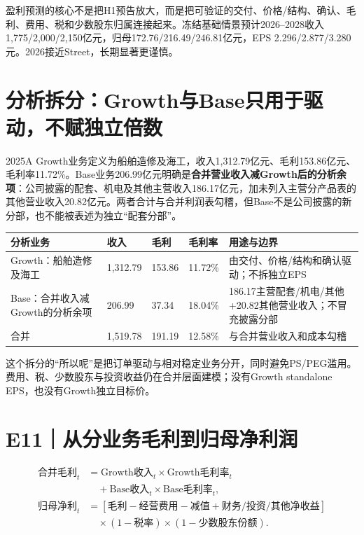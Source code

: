 盈利预测的核心不是把H1预告放大，而是把可验证的交付、价格/结构、确认、毛利、费用、税和少数股东归属连接起来。冻结基础情景预计2026--2028收入1,775/2,000/2,150亿元，归母172.76/216.49/246.81亿元，EPS 2.296/2.877/3.280元。2026接近Street，长期显著更谨慎。

\section{分析拆分：Growth与Base只用于驱动，不赋独立倍数}

2025A Growth业务定义为船舶造修及海工，收入1,312.79亿元、毛利153.86亿元、毛利率11.72\%。Base业务206.99亿元明确是\textbf{合并营业收入减Growth后的分析余项}：公司披露的配套、机电及其他主营收入186.17亿元，加未列入主营分产品表的其他营业收入20.82亿元。两者合计与合并利润表勾稽，但Base不是公司披露的新分部，也不能被表述为独立“配套分部”。

\begin{exhibitbox}[2025A分析基线]
\small
\begin{tabularx}{\exhibitboxwidth}{L{3.4cm}R{2.6cm}R{2.6cm}R{2.3cm}X}
\toprule
\textbf{分析业务} & \textbf{收入} & \textbf{毛利} & \textbf{毛利率} & \textbf{用途与边界} \\
\midrule
Growth：船舶造修及海工 & 1,312.79 & 153.86 & 11.72\% & 由交付、价格/结构和确认驱动；不拆独立EPS \\
Base：合并收入减Growth的分析余项 & 206.99 & 37.34 & 18.04\% & 186.17主营配套/机电/其他+20.82其他营业收入；不冒充披露分部 \\
合并 & 1,519.78 & 191.19 & 12.58\% & 与合并营业收入和成本勾稽 \\
\bottomrule
\end{tabularx}
\end{exhibitbox}

这个拆分的“所以呢”是把订单驱动与相对稳定业务分开，同时避免PS/PEG滥用。费用、税、少数股东与投资收益仍在合并层面建模；没有Growth standalone EPS，也没有Growth独立目标价。

\section{E11｜从分业务毛利到归母净利润}

\begin{equation*}
\begin{split}
\text{合并毛利}_{t}&=\text{Growth收入}_{t}\times\text{Growth毛利率}_{t}\\
&\quad+\text{Base收入}_{t}\times\text{Base毛利率}_{t},\\
\text{归母净利}_{t}&=[\text{毛利}-\text{经营费用}-\text{减值}+\text{财务/投资/其他净收益}]\\
&\quad\times(1-\text{税率})\times(1-\text{少数股东份额}).
\end{split}
\end{equation*}

